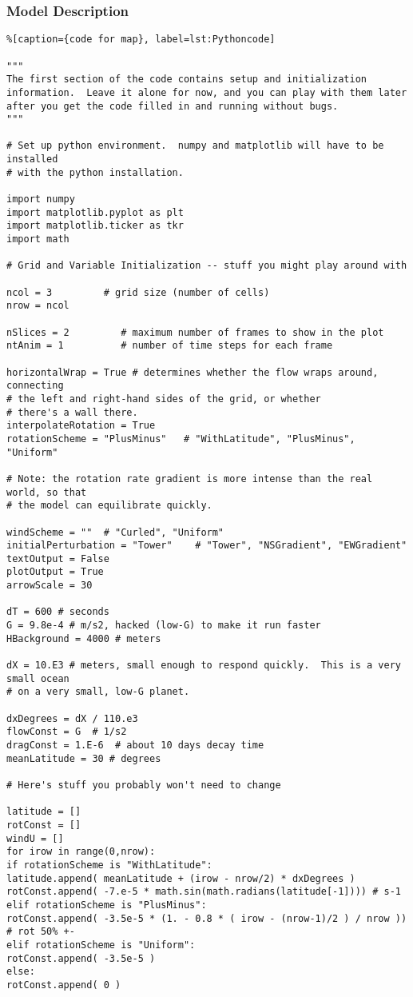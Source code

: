 \subsubsection{Model Description}

\begin{lstlisting}%[caption={code for map}, label=lst:Pythoncode]

"""
The first section of the code contains setup and initialization 
information.  Leave it alone for now, and you can play with them later 
after you get the code filled in and running without bugs.  
"""

# Set up python environment.  numpy and matplotlib will have to be installed
# with the python installation.

import numpy
import matplotlib.pyplot as plt
import matplotlib.ticker as tkr
import math

# Grid and Variable Initialization -- stuff you might play around with

ncol = 3         # grid size (number of cells)
nrow = ncol

nSlices = 2         # maximum number of frames to show in the plot
ntAnim = 1          # number of time steps for each frame

horizontalWrap = True # determines whether the flow wraps around, connecting
# the left and right-hand sides of the grid, or whether
# there's a wall there. 
interpolateRotation = True
rotationScheme = "PlusMinus"   # "WithLatitude", "PlusMinus", "Uniform"

# Note: the rotation rate gradient is more intense than the real world, so that
# the model can equilibrate quickly.

windScheme = ""  # "Curled", "Uniform"
initialPerturbation = "Tower"    # "Tower", "NSGradient", "EWGradient"
textOutput = False
plotOutput = True
arrowScale = 30

dT = 600 # seconds
G = 9.8e-4 # m/s2, hacked (low-G) to make it run faster
HBackground = 4000 # meters

dX = 10.E3 # meters, small enough to respond quickly.  This is a very small ocean
# on a very small, low-G planet.  

dxDegrees = dX / 110.e3
flowConst = G  # 1/s2
dragConst = 1.E-6  # about 10 days decay time
meanLatitude = 30 # degrees

# Here's stuff you probably won't need to change

latitude = []
rotConst = []
windU = []
for irow in range(0,nrow):
if rotationScheme is "WithLatitude":
latitude.append( meanLatitude + (irow - nrow/2) * dxDegrees )
rotConst.append( -7.e-5 * math.sin(math.radians(latitude[-1]))) # s-1
elif rotationScheme is "PlusMinus":
rotConst.append( -3.5e-5 * (1. - 0.8 * ( irow - (nrow-1)/2 ) / nrow )) # rot 50% +-
elif rotationScheme is "Uniform":
rotConst.append( -3.5e-5 ) 
else:
rotConst.append( 0 )


\end{lstlisting}
